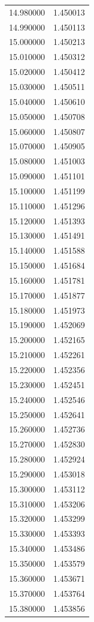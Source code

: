 \begin{tabular}{rr}
14.980000 & 1.450013 \\
14.990000 & 1.450113 \\
15.000000 & 1.450213 \\
15.010000 & 1.450312 \\
15.020000 & 1.450412 \\
15.030000 & 1.450511 \\
15.040000 & 1.450610 \\
15.050000 & 1.450708 \\
15.060000 & 1.450807 \\
15.070000 & 1.450905 \\
15.080000 & 1.451003 \\
15.090000 & 1.451101 \\
15.100000 & 1.451199 \\
15.110000 & 1.451296 \\
15.120000 & 1.451393 \\
15.130000 & 1.451491 \\
15.140000 & 1.451588 \\
15.150000 & 1.451684 \\
15.160000 & 1.451781 \\
15.170000 & 1.451877 \\
15.180000 & 1.451973 \\
15.190000 & 1.452069 \\
15.200000 & 1.452165 \\
15.210000 & 1.452261 \\
15.220000 & 1.452356 \\
15.230000 & 1.452451 \\
15.240000 & 1.452546 \\
15.250000 & 1.452641 \\
15.260000 & 1.452736 \\
15.270000 & 1.452830 \\
15.280000 & 1.452924 \\
15.290000 & 1.453018 \\
15.300000 & 1.453112 \\
15.310000 & 1.453206 \\
15.320000 & 1.453299 \\
15.330000 & 1.453393 \\
15.340000 & 1.453486 \\
15.350000 & 1.453579 \\
15.360000 & 1.453671 \\
15.370000 & 1.453764 \\
15.380000 & 1.453856 \\

\end{tabular}
